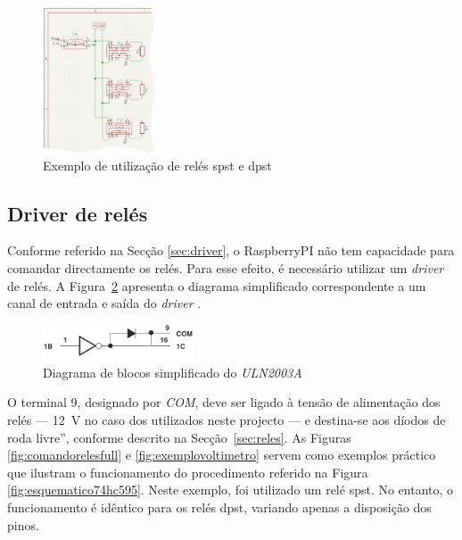 \begin{figure}[hbtp]
	\centering
	\includegraphics[width=0.3\textwidth]{figures/exemplo_reles_spst.png}
	\caption{Exemplo de utilização de relés \acrshort{spst} e \acrshort{dpst}}
	\label{fig:relespstdpst}
\end{figure}

\subsection{Driver de relés}
\label{sec:driverreles}
Conforme referido na Secção \ref{sec:driver}, o \gls{RaspberryPI} não tem capacidade para comandar directamente os relés. Para esse efeito, é necessário utilizar um \textit{driver} de relés. A Figura~\ref{fig:diagramablocos2003} apresenta o diagrama simplificado correspondente a um canal de entrada e saída do \textit{driver} \cite{ULN2003}.

\begin{figure}[hbtp]
	\centering
	\includegraphics[width=0.4\textwidth]{figures/uln2003_diagramablocos.png}
	\caption{Diagrama de blocos simplificado do \textit{ULN2003A}}
	\label{fig:diagramablocos2003}
\end{figure}

O terminal 9, designado por \textit{COM}, deve ser ligado à tensão de alimentação dos relés — \SI{12}{\volt} no caso dos utilizados neste projecto — e destina-se aos díodos de roda livre'', conforme descrito na Secção~\ref{sec:reles}. As Figuras \ref{fig:comandorelesfull} e \ref{fig:exemplovoltimetro} servem como exemplos práctico que ilustram o funcionamento do procedimento referido na Figura \ref{fig:esquematico74hc595}. Neste exemplo, foi utilizado um relé \acrshort{spst}. No entanto, o funcionamento é idêntico para os relés \acrshort{dpst}, variando apenas a disposição dos pinos.

